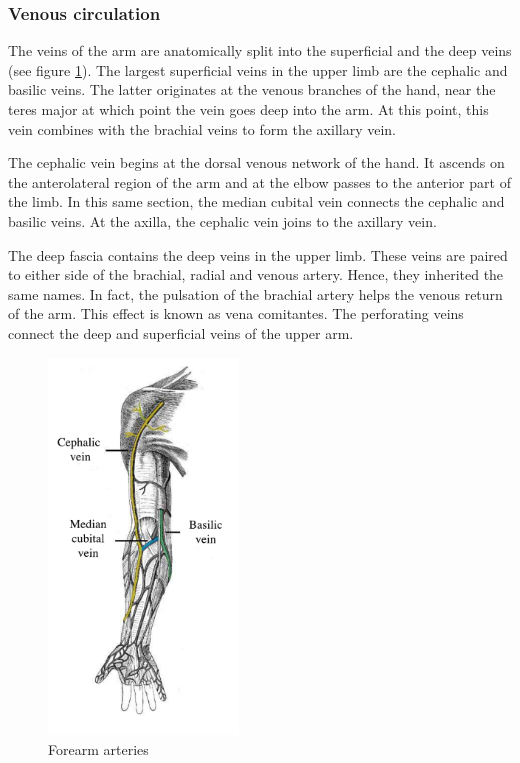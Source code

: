 \subsubsection{Venous circulation}
The veins of the arm are anatomically split into the superficial and the deep veins (see figure \ref{fig:arm veind}). The largest superficial veins in the upper limb are the cephalic and basilic veins. The latter originates at the venous branches of the hand, near the teres major at which point the vein goes deep into the arm. At this point, this vein combines with the brachial veins to form the axillary vein. 

The cephalic vein begins at the dorsal venous network of the hand. It ascends on the anterolateral region of the arm and at the elbow passes to the anterior part of the limb. In this same section, the median cubital vein connects the cephalic and basilic veins. At the axilla, the cephalic vein joins to the axillary vein. 

The deep fascia contains the deep veins in the upper limb. These veins are paired to either side of the brachial, radial and venous artery. Hence, they inherited the same names.  In fact, the pulsation of the brachial artery helps the venous return of the arm. This effect is known as vena comitantes. The perforating veins connect the deep and superficial veins of the upper arm. 

\begin{figure}[!htpb]
	\centering
	\includegraphics[height=10cm,keepaspectratio]{figure21}
	\caption{Forearm arteries}
	\label{fig:arm veind}
\end{figure} 

